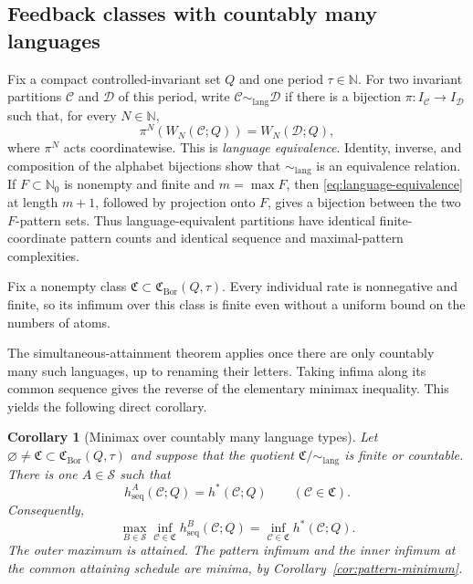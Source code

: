 \documentclass[11pt,reqno]{amsart}
\numberwithin{equation}{section}
\newtheorem{corollary}[theorem]{Corollary}
\theoremstyle{definition}
\theoremstyle{definition}
\newcommand{\N}{\mathbb N}
\newcommand{\Nzero}{\mathbb N_0}
\newcommand{\C}{\mathcal C}
\newcommand{\D}{\mathcal D}
\newcommand{\hseq}{h_{\mathrm{seq}}}
\newcommand{\hpat}{h^{*}}
\newcommand{\Bor}{\mathrm{Bor}}
\newcommand{\lang}{\mathrm{lang}}
\begin{document}
\subsection{Feedback classes with countably many languages}\label{sec:minimax}

Fix a compact controlled-invariant set $Q$ and one period $\tau\in\N$.
For two invariant partitions $\C$ and $\D$ of this period, write
$\C\sim_{\lang}\D$ if there is a bijection
$\pi:I_\C\to I_\D$ such that, for every $N\in\N$,
\begin{equation}\label{eq:language-equivalence}
 \pi^N(W_N(\C;Q))=W_N(\D;Q),
\end{equation}
where $\pi^N$ acts coordinatewise.  This is \emph{language equivalence}.
Identity, inverse, and composition of the alphabet bijections show that
$\sim_{\lang}$ is an equivalence relation.  If $F\subset\Nzero$ is nonempty and finite and
$m=\max F$, then \eqref{eq:language-equivalence} at length $m+1$, followed by
projection onto $F$, gives a bijection between the two $F$-pattern sets.
Thus language-equivalent partitions have identical finite-coordinate pattern
counts and identical sequence and maximal-pattern complexities.

Fix a nonempty class $\mathfrak C\subset\mathfrak C_{\Bor}(Q,\tau)$.
Every individual rate is nonnegative and finite, so its infimum over
this class is finite even without a uniform bound on the numbers of atoms.

The simultaneous-attainment theorem applies once there are only
countably many such languages, up to renaming their letters. Taking
infima along its common sequence gives the reverse of the elementary
minimax inequality. This yields the following direct corollary.

\begin{corollary}[Minimax over countably many language types]\label{thm:B}
Let $\varnothing\ne\mathfrak C\subset\mathfrak C_{\Bor}(Q,\tau)$ and suppose
that the quotient $\mathfrak C/{\sim_{\lang}}$ is finite or countable.  There
is one $A\in\mathscr S$ such that
\begin{equation}\label{eq:pointwise-class-attainment}
 \hseq^A(\C;Q)=\hpat(\C;Q)
 \qquad(\C\in\mathfrak C).
\end{equation}
Consequently,
\begin{equation}\label{eq:minimax}
 \max_{B\in\mathscr S}\inf_{\C\in\mathfrak C}
 \hseq^B(\C;Q)
 =\inf_{\C\in\mathfrak C}\hpat(\C;Q).
\end{equation}
The outer maximum is attained. The pattern infimum and the inner infimum at the common attaining schedule are minima, by Corollary~\ref{cor:pattern-minimum}.
\end{corollary}
\end{document}

